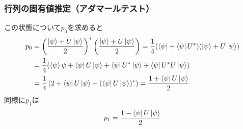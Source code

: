\documentclass[9pt]{beamer}
\let\Re\relax
\DeclareMathOperator{\Re}{Re}
\begin{document}
\begin{frame}
    \frametitle{行列の固有値推定（アダマールテスト）}
    この状態について$p_0$を求めると
    \begin{align}
        p_0 &= \left( \dfrac{\ket{\psi} + U\ket{\psi}}{2} \right)^* \left( \dfrac{\ket{\psi} + U\ket{\psi}}{2} \right) 
        = 
        \frac{1}{4} (\bra{\psi} + \bra{\psi}U^*)(\ket{\psi} + U\ket{\psi}) \\
        &=
        \frac{1}{4} (\braket{\psi}{\psi} + \bra{\psi}U\ket{\psi} + \bra{\psi}U^*\ket{\psi} + \bra{\psi}U^*U\ket{\psi}) \\
        &=
        \frac{1}{4} \left( 2 + \bra{\psi}U\ket{\psi} + (\bra{\psi}U\ket{\psi})^* \right) 
        = 
        \dfrac{1 + \Re \bra{\psi}U\ket{\psi}}{2}
    \end{align}
    同様に$p_1$は
    \begin{align}
        p_1 = \dfrac{1 - \Re \bra{\psi}U\ket{\psi}}{2}
    \end{align}
\end{frame}
\end{document}
